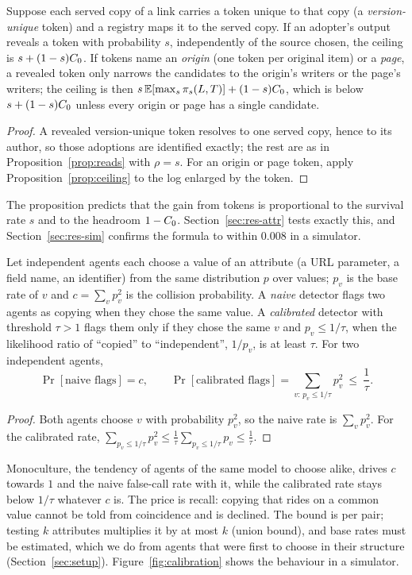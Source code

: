 \begin{proposition}[Tokens]\label{prop:tags}
Suppose each served copy of a link carries a token unique to that copy (a \emph{version-unique} token) and a registry maps it to the served copy. If an adopter's output reveals a token with probability $s$, independently of the source chosen, the ceiling is $s+(1-s)C_0$. If tokens name an \emph{origin} (one token per original item) or a \emph{page}, a revealed token only narrows the candidates to the origin's writers or the page's writers; the ceiling is then $s\,\mathbb{E}[\max_s\pi_s(L,T)]+(1-s)C_0$, which is below $s+(1-s)C_0$ unless every origin or page has a single candidate.
\end{proposition}
\begin{proof}
A revealed version-unique token resolves to one served copy, hence to its author, so those adoptions are identified exactly; the rest are as in Proposition~\ref{prop:reads} with $\rho=s$. For an origin or page token, apply Proposition~\ref{prop:ceiling} to the log enlarged by the token.
\end{proof}
The proposition predicts that the gain from tokens is proportional to the survival rate $s$ and to the headroom $1-C_0$. Section~\ref{sec:res-attr} tests exactly this, and Section~\ref{sec:res-sim} confirms the formula to within $0.008$ in a simulator.

\begin{proposition}[Calibration]\label{prop:calib}
Let independent agents each choose a value of an attribute (a URL parameter, a field name, an identifier) from the same distribution $p$ over values; $p_v$ is the base rate of $v$ and $c=\sum_v p_v^2$ is the collision probability. A \emph{naive} detector flags two agents as copying when they chose the same value. A \emph{calibrated} detector with threshold $\tau>1$ flags them only if they chose the same $v$ and $p_v\le 1/\tau$, \ie when the likelihood ratio of ``copied'' to ``independent'', $1/p_v$, is at least $\tau$. For two independent agents,
\[
\Pr[\text{naive flags}]=c,\qquad \Pr[\text{calibrated flags}]=\sum_{v:\,p_v\le 1/\tau}p_v^2\ \le\ \frac1\tau .
\]
\end{proposition}
\begin{proof}
Both agents choose $v$ with probability $p_v^2$, so the naive rate is $\sum_v p_v^2$. For the calibrated rate, $\sum_{p_v\le1/\tau}p_v^2\le\frac1\tau\sum_{p_v\le 1/\tau}p_v\le\frac1\tau$.
\end{proof}
Monoculture, the tendency of agents of the same model to choose alike, drives $c$ towards $1$ and the naive false-call rate with it, while the calibrated rate stays below $1/\tau$ whatever $c$ is. The price is recall: copying that rides on a common value cannot be told from coincidence and is declined. The bound is per pair; testing $k$ attributes multiplies it by at most $k$ (union bound), and base rates must be estimated, which we do from agents that were first to choose in their structure (Section~\ref{sec:setup}). Figure~\ref{fig:calibration} shows the behaviour in a simulator.


